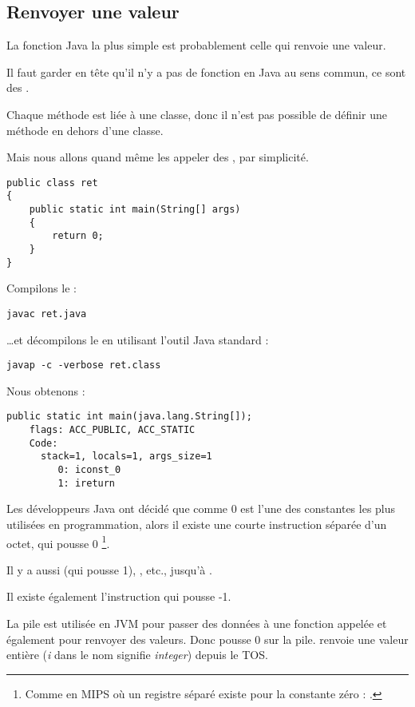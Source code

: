 \subsection{Renvoyer une valeur}

La fonction Java la plus simple est probablement celle qui renvoie une valeur.

Il faut garder en tête qu'il n'y a pas de fonction  en Java au sens commun,
ce sont des .

Chaque méthode est liée à une classe, donc il n'est pas possible de définir
une méthode en dehors d'une classe.

Mais nous allons quand même les appeler des , par simplicité.

\begin{lstlisting}[style=customjava]
public class ret
{
	public static int main(String[] args)
	{
		return 0;
	}
}
\end{lstlisting}

Compilons le :

\begin{lstlisting}
javac ret.java
\end{lstlisting}

\dots et décompilons le en utilisant l'outil Java standard :

\begin{lstlisting}
javap -c -verbose ret.class
\end{lstlisting}

Nous obtenons :

\begin{lstlisting}[caption=JDK 1.7 (extrait)]
  public static int main(java.lang.String[]);
    flags: ACC_PUBLIC, ACC_STATIC
    Code:
      stack=1, locals=1, args_size=1
         0: iconst_0
         1: ireturn
\end{lstlisting}

Les développeurs Java ont décidé que comme 0 est l'une des constantes les plus utilisées en programmation,
alors il existe une courte instruction séparée d'un octet,  qui pousse 0
\footnote{Comme en MIPS où un registre séparé existe pour la constante zéro : .}.

Il y a aussi  (qui pousse 1), , etc., jusqu'à .

Il existe également l'instruction  qui pousse -1.

La pile est utilisée en JVM pour passer des données à une fonction appelée et également pour renvoyer des valeurs.
Donc  pousse 0 sur la pile.
 renvoie une valeur entière (\emph{i} dans le nom signifie \emph{integer}) depuis le \ac{TOS}.

